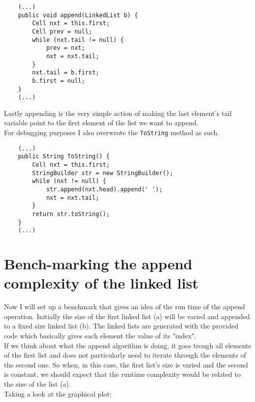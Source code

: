 \documentclass[a4paper,11pt]{article}
\begin{document}
\begin{verbatim}
    (...)
    public void append(LinkedList b) {
        Cell nxt = this.first;
        Cell prev = null;
        while (nxt.tail != null) {
            prev = nxt;
            nxt = nxt.tail;
        }
        nxt.tail = b.first;
        b.first = null;
    }
    (...)
\end{verbatim}

Lastly appending is the very simple action of making the last element's tail variable point to the first element of the list we want to append.
\\

For debugging purposes I also overwrote the {\tt ToString} method as such.

\begin{verbatim}
    (...)
    public String ToString() {
        Cell nxt = this.first;
        StringBuilder str = new StringBuilder();
        while (nxt != null) {
            str.append(nxt.head).append(' ');
            nxt = nxt.tail;
        }
        return str.toString();
    }
    (...)
\end{verbatim}

\section*{Bench-marking the append complexity of the linked list}

Now I will set up a benchmark that gives an idea of the run
time of the append operation. Initially the size of the first linked
list (a) will be varied and appended to a fixed size linked list (b). The linked lists are generated with the provided code which basically gives each element the value of its "index". 
\\

If we think about what the append algorithm is doing, it goes trough all elements of the first list and does not particularly need to iterate through the elements of the second one. So when, in this case, the first list's size is varied and the second is constant, we should expect that the runtime complexity would be related to the size of the list (a).
\\

Taking a look at the graphical plot:
\end{document}
